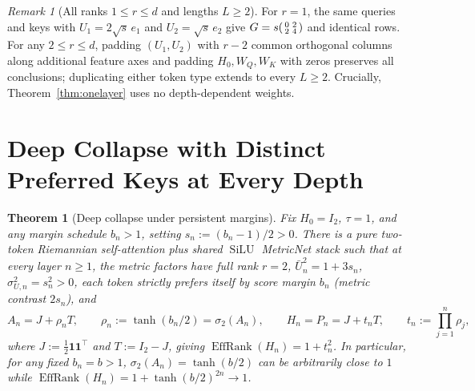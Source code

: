 \documentclass[11pt]{article}
\theoremstyle{plain}
\newtheorem{theorem}{Theorem}
\theoremstyle{definition}
\theoremstyle{remark}
\newtheorem{remark}{Remark}
\DeclareMathOperator{\EffRank}{EffRank}
\DeclareMathOperator{\SiLU}{SiLU}
\begin{document}
\begin{remark}[All ranks $1 \le r \le d$ and lengths $L \ge 2$]
For $r = 1$, the same queries and keys with $U_1 = 2\sqrt{s}\,e_1$ and $U_2 = \sqrt{s}\,e_2$ give $G = s\begin{psmallmatrix}0 & 2 \\ 2 & 4\end{psmallmatrix}$ and identical rows. For any $2 \le r \le d$, padding $(U_1, U_2)$ with $r - 2$ common orthogonal columns along additional feature axes and padding $H_0, W_Q, W_K$ with zeros preserves all conclusions; duplicating either token type extends to every $L \ge 2$. Crucially, Theorem~\ref{thm:onelayer} uses no depth-dependent weights.
\end{remark}

\section{Deep Collapse with Distinct Preferred Keys at Every Depth}

\begin{theorem}[Deep collapse under persistent margins]\label{thm:deep}
Fix $H_0 = I_2$, $\tau = 1$, and any margin schedule $b_n > 1$, setting $s_n := (b_n - 1)/2 > 0$. There is a pure two-token Riemannian self-attention plus shared $\SiLU$ MetricNet stack such that at every layer $n \ge 1$, the metric factors have full rank $r = 2$, $\bar U_n^2 = 1 + 3s_n$, $\sigma_{U,n}^2 = s_n^2 > 0$, each token strictly prefers itself by score margin $b_n$ (metric contrast $2s_n$), and
\[
A_n = J + \rho_n T, \qquad \rho_n := \tanh(b_n/2) = \sigma_2(A_n), \qquad
H_n = P_n = J + t_n T, \qquad t_n := \prod_{j=1}^n \rho_j,
\]
where $J := \frac{1}{2}\mathbf{1}\mathbf{1}^\top$ and $T := I_2 - J$, giving $\EffRank(H_n) = 1 + t_n^2$. In particular, for any fixed $b_n = b > 1$, $\sigma_2(A_n) = \tanh(b/2)$ can be arbitrarily close to $1$ while $\EffRank(H_n) = 1 + \tanh(b/2)^{2n} \to 1$.
\end{theorem}
\end{document}
